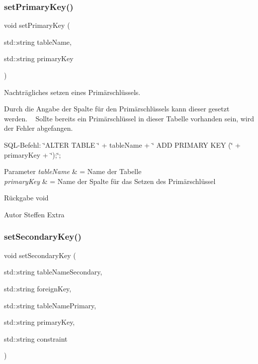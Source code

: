 \subsubsection{set\+Primary\+Key()}
{\footnotesize\ttfamily void set\+Primary\+Key (\begin{DoxyParamCaption}\item[{std\+::string}]{table\+Name,  }\item[{std\+::string}]{primary\+Key }\end{DoxyParamCaption})}



Nachträgliches setzen eines Primärschlüssels. 

Durch die Angabe der Spalte für den Primärschlüssels kann dieser gesetzt werden. ~\newline
 Sollte bereits ein Primärschlüssel in dieser Tabelle vorhanden sein, wird der Fehler abgefangen.~\newline


S\+Q\+L-\/\+Befehl\+: \char`\"{}\+A\+L\+T\+E\+R T\+A\+B\+L\+E \char`\"{} + table\+Name + \char`\"{} A\+D\+D P\+R\+I\+M\+A\+R\+Y K\+E\+Y (\char`\"{} + primary\+Key + \char`\"{});\char`\"{};


\begin{DoxyParams}{Parameter}
{\em table\+Name} & = Name der Tabelle \\
\hline
{\em primary\+Key} & = Name der Spalte für das Setzen des Primärschlüssel\\
\hline
\end{DoxyParams}
\begin{DoxyReturn}{Rückgabe}
void
\end{DoxyReturn}
\begin{DoxyAuthor}{Autor}
Steffen Extra 
\end{DoxyAuthor}
\mbox{\label{tables_8hpp_a4aca01f302c4488d661196653d8f6c28}} 
\subsubsection{set\+Secondary\+Key()}
{\footnotesize\ttfamily void set\+Secondary\+Key (\begin{DoxyParamCaption}\item[{std\+::string}]{table\+Name\+Secondary,  }\item[{std\+::string}]{foreign\+Key,  }\item[{std\+::string}]{table\+Name\+Primary,  }\item[{std\+::string}]{primary\+Key,  }\item[{std\+::string}]{constraint }\end{DoxyParamCaption})}



